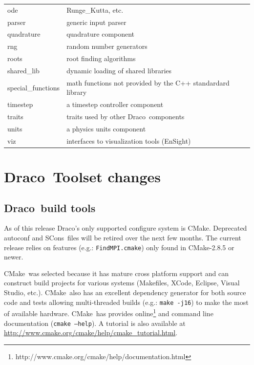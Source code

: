 \documentclass[note]{ResearchNote_pdf}
\newcommand{\draco}{Draco}
\newcommand{\cmake}{\textsf{CMake}}
\newcommand{\scons}{\textsf{SCons}}
\newcommand{\tableText}[1]{{\raggedright #1}}
\begin{document}
\begin{center}
\begin{tabular}{lp{4.0in}}
    \textsf{ode}          & \tableText{Runge\_Kutta, etc.} \\
    \textsf{parser}       & \tableText{generic input parser} \\
    \textsf{quadrature}   & \tableText{quadrature component} \\
    \textsf{rng}          & \tableText{random number generators} \\
    \textsf{roots}        & \tableText{root finding algorithms} \\
    \textsf{shared\_lib}  & \tableText{dynamic loading of shared libraries} \\
    \textsf{special\_functions} & \tableText{math functions not provided by the
      C++ standardard library} \\
    \textsf{timestep}     & \tableText{a timestep controller component} \\
    \textsf{traits}       & \tableText{traits used by other \draco\ components} \\
    \textsf{units}        & \tableText{a physics units component} \\
    \textsf{viz}          & \tableText{interfaces to visualization tools (EnSight)} \\
    \hline\hline 
  \end{tabular}
\end{center}


\section{\draco\ Toolset changes}
\subsection{\draco\ build tools}

As of this release \draco's only supported configure system is
\cmake\cite{cmake}.  Deprecated autoconf and \scons\ files will be
retired over the next few months.  The current release relies on
features (e.g.: \texttt{FindMPI.cmake}) only found in \cmake-2.8.5 or
newer.

\cmake\ was selected because it has mature cross platform support and
can construct build projects for various systems (\textsf{Makefiles},
\textsf{XCode}, \textsf{Eclipse}, \textsf{Visual Studio}, etc.).
\cmake\ also has an excellent dependency generator for both source
code and tests allowing multi-threaded builds (e.g.: \texttt{make
  -j16}) to make the most of available hardware.  \cmake\ has provides
online\footnote{http://www.cmake.org/cmake/help/documentation.html}
and command line documentation (\texttt{cmake --help}). A tutorial is
also available at
\url{http://www.cmake.org/cmake/help/cmake_tutorial.html}.
\end{document}
